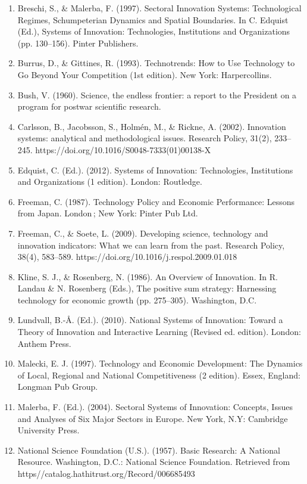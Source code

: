 \documentclass[a4paper,11pt]{article}
\begin{document}
\begin{enumerate}
\item Breschi, S., \& Malerba, F. (1997). Sectoral Innovation Systems: Technological Regimes, Schumpeterian Dynamics and Spatial Boundaries. In C. Edquist (Ed.), Systems of Innovation: Technologies, Institutions and Organizations (pp. 130–156). Pinter Publishers.
\item Burrus, D., \& Gittines, R. (1993). Technotrends: How to Use Technology to Go Beyond Your Competition (1st edition). New York: Harpercollins.
\item Bush, V. (1960). Science, the endless frontier: a report to the President on a program for postwar scientific research.
\item Carlsson, B., Jacobsson, S., Holmén, M., \& Rickne, A. (2002). Innovation systems: analytical and methodological issues. Research Policy, 31(2), 233–245. https://doi.org/10.1016/S0048-7333(01)00138-X
\item Edquist, C. (Ed.). (2012). Systems of Innovation: Technologies, Institutions and Organizations (1 edition). London: Routledge.
\item Freeman, C. (1987). Technology Policy and Economic Performance: Lessons from Japan. London ; New York: Pinter Pub Ltd.
\item Freeman, C., \& Soete, L. (2009). Developing science, technology and innovation indicators: What we can learn from the past. Research Policy, 38(4), 583–589. https://doi.org/10.1016/j.respol.2009.01.018
\item Kline, S. J., \& Rosenberg, N. (1986). An Overview of Innovation. In R. Landau \& N. Rosenberg (Eds.), The positive sum strategy: Harnessing technology for economic growth (pp. 275–305). Washington, D.C.
\item Lundvall, B.-Å. (Ed.). (2010). National Systems of Innovation: Toward a Theory of Innovation and Interactive Learning (Revised ed. edition). London: Anthem Press.
\item Malecki, E. J. (1997). Technology and Economic Development: The Dynamics of Local, Regional and National Competitiveness (2 edition). Essex, England: Longman Pub Group.
\item Malerba, F. (Ed.). (2004). Sectoral Systems of Innovation: Concepts, Issues and Analyses of Six Major Sectors in Europe. New York, N.Y: Cambridge University Press.
\item National Science Foundation (U.S.). (1957). Basic Research: A National Resource. Washington, D.C.: National Science Foundation. Retrieved from https//catalog.hathitrust.org/Record/006685493

\end{enumerate}
\end{document}
